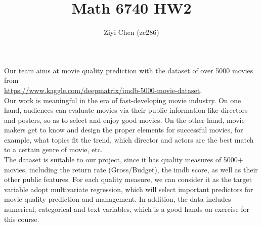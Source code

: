 \documentclass{article}
\author{Ziyi Chen (zc286)}
\title{Math 6740 HW2}
\begin{document}
  Our team aims at movie quality prediction with the dataset of over 5000 movies from\\
\url {https://www.kaggle.com/deepmatrix/imdb-5000-movie-dataset}.\\
\indent
  Our work is meaningful in the era of fast-developing movie industry. On one hand, audiences can evaluate movies via their public information like directors and posters, so as to select and enjoy good movies. On the other hand, movie makers get to know and design the proper elements for successful movies, for example, what topics fit the trend, which director and actors are the best match to a certain genre of movie, etc.\\
\indent
  The dataset is suitable to our project, since it has quality measures of 5000+ movies, including the return rate (Gross/Budget), the imdb score, as well as their other public features. For each quality measure, we can consider it as the target variable adopt multivariate regression, which will select important predictors for movie quality prediction and management. In addition, the data includes numerical, categorical and text variables, which is a good hands on exercise for this course.\\
\end{document}
